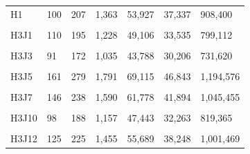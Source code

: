 \documentclass[
  a4paper,
  titlepage]{article}
\begin{document}
\begin{longtable}[t]{lllllll}
H1 & 100 & 207 & 1,363 & 53,927 & 37,337 & 908,400\\
 
\cellcolor{gray!6}{H3} & \cellcolor{gray!6}{93} & \cellcolor{gray!6}{165} & \cellcolor{gray!6}{989} & \cellcolor{gray!6}{40,638} & \cellcolor{gray!6}{27,228} & \cellcolor{gray!6}{693,832}\\
 
H3J1 & 110 & 195 & 1,228 & 49,106 & 33,535 & 799,112\\
 
\cellcolor{gray!6}{H3J2} & \cellcolor{gray!6}{113} & \cellcolor{gray!6}{170} & \cellcolor{gray!6}{1,058} & \cellcolor{gray!6}{44,888} & \cellcolor{gray!6}{31,088} & \cellcolor{gray!6}{809,061}\\
 
H3J3 & 91 & 172 & 1,035 & 43,788 & 30,206 & 731,620\\
 
\cellcolor{gray!6}{H3J4} & \cellcolor{gray!6}{91} & \cellcolor{gray!6}{179} & \cellcolor{gray!6}{1,192} & \cellcolor{gray!6}{47,169} & \cellcolor{gray!6}{32,859} & \cellcolor{gray!6}{794,659}\\
 
H3J5 & 161 & 279 & 1,791 & 69,115 & 46,843 & 1,194,576\\
 
\cellcolor{gray!6}{H3J6} & \cellcolor{gray!6}{109} & \cellcolor{gray!6}{203} & \cellcolor{gray!6}{1,291} & \cellcolor{gray!6}{52,100} & \cellcolor{gray!6}{36,135} & \cellcolor{gray!6}{983,375}\\
 
H3J7 & 146 & 238 & 1,590 & 61,778 & 41,894 & 1,045,455\\
 
\cellcolor{gray!6}{H3J8} & \cellcolor{gray!6}{120} & \cellcolor{gray!6}{201} & \cellcolor{gray!6}{1,344} & \cellcolor{gray!6}{53,255} & \cellcolor{gray!6}{36,150} & \cellcolor{gray!6}{924,052}\\
 
H3J10 & 98 & 188 & 1,157 & 47,443 & 32,263 & 819,365\\
 
\cellcolor{gray!6}{H3J11} & \cellcolor{gray!6}{146} & \cellcolor{gray!6}{226} & \cellcolor{gray!6}{1,491} & \cellcolor{gray!6}{58,076} & \cellcolor{gray!6}{39,515} & \cellcolor{gray!6}{965,573}\\
 
H3J12 & 125 & 225 & 1,455 & 55,689 & 38,248 & 1,001,469\\
 

\end{longtable}
\end{document}
